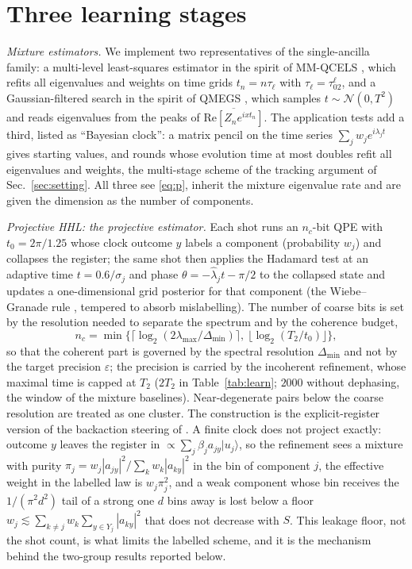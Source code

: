 \documentclass[journal]{IEEEtran}
\newcommand{\lmax}{\lambda_{\max}}
\begin{document}
\section{Three learning stages}
\label{sec:stages}

\emph{Mixture estimators.} We implement two representatives of the single-ancilla family: a multi-level least-squares estimator in the spirit of MM-QCELS \cite{DingLin2023}, which refits all eigenvalues and weights on time grids $t_n=n\tau_\ell$ with $\tau_\ell=\tau_02^\ell$, and a Gaussian-filtered search in the spirit of QMEGS \cite{QMEGS2024}, which samples $t\sim\mathcal N(0,T^2)$ and reads eigenvalues from the peaks of $\overline{\mathrm{Re}[Z_ne^{ixt_n}]}$. The application tests add a third, listed as ``Bayesian clock'': a matrix pencil on the time series $\sum_jw_je^{i\lambda_jt}$ \cite{OBrien2019} gives starting values, and rounds whose evolution time at most doubles refit all eigenvalues and weights, the multi-stage scheme of the tracking argument of Sec.~\ref{sec:setting}. All three see \eqref{eq:p}, inherit the mixture eigenvalue rate and are given the dimension as the number of components.

\emph{Projective HHL: the projective estimator.} Each shot runs an $n_c$-bit QPE with $t_0=2\pi/1.25$ whose clock outcome $y$ labels a component (probability $w_j$) and collapses the register; the same shot then applies the Hadamard test at an adaptive time $t=0.6/\sigma_{j}$ and phase $\theta=-\hat\lambda_jt-\pi/2$ to the collapsed state and updates a one-dimensional grid posterior for that component (the Wiebe--Granade rule \cite{WiebeGranade2016}, tempered to absorb mislabelling). The number of coarse bits is set by the resolution needed to separate the spectrum and by the coherence budget,
\begin{equation}
n_c=\min\big\{\lceil\log_2(2\lmax/\Delta_{\min})\rceil,\ \lfloor\log_2(T_2/t_0)\rfloor\big\},
\label{eq:nc}
\end{equation}
so that the coherent part is governed by the spectral resolution $\Delta_{\min}$ and not by the target precision $\varepsilon$; the precision is carried by the incoherent refinement, whose maximal time is capped at $T_2$ ($2T_2$ in Table~\ref{tab:learn}; $2000$ without dephasing, the window of the mixture baselines). Near-degenerate pairs below the coarse resolution are treated as one cluster. The construction is the explicit-register version of the backaction steering of \cite{Jin2023}. A finite clock does not project exactly: outcome $y$ leaves the register in $\propto\sum_j\beta_ja_{jy}|u_j\rangle$, so the refinement sees a mixture with purity $\pi_j=w_j|a_{jy}|^2/\sum_kw_k|a_{ky}|^2$ in the bin of component $j$, the effective weight in the labelled law is $w_j\pi_j^2$, and a weak component whose bin receives the $1/(\pi^2d^2)$ tail of a strong one $d$ bins away is lost below a floor $w_j\lesssim\sum_{k\ne j}w_k\sum_{y\in Y_j}|a_{ky}|^2$ that does not decrease with $S$. This leakage floor, not the shot count, is what limits the labelled scheme, and it is the mechanism behind the two-group results reported below.
\end{document}
